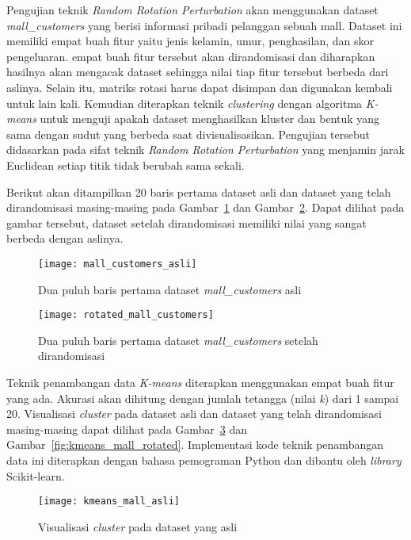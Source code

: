 Pengujian teknik \textit{Random Rotation Perturbation} akan menggunakan dataset \textit{mall\_customers} yang berisi informasi pribadi pelanggan sebuah mall. Dataset ini memiliki empat buah fitur yaitu jenis kelamin, umur, penghasilan, dan skor pengeluaran. empat buah fitur tersebut akan dirandomisasi dan diharapkan hasilnya akan mengacak dataset sehingga nilai tiap fitur tersebut berbeda dari aslinya. Selain itu, matriks rotasi harus dapat disimpan dan digunakan kembali untuk lain kali. Kemudian diterapkan teknik \textit{clustering} dengan algoritma \textit{K-means} untuk menguji apakah dataset menghasilkan kluster dan bentuk yang sama dengan sudut yang berbeda saat divisualisasikan. Pengujian tersebut didasarkan pada sifat teknik \textit{Random Rotation Perturbation} yang menjamin jarak Euclidean setiap titik tidak berubah sama sekali.

Berikut akan ditampilkan 20 baris pertama dataset asli dan dataset yang telah dirandomisasi masing-masing pada Gambar~\ref{fig:mall_customers_asli} dan Gambar~\ref{fig:rotated_mall_customers}. Dapat dilihat pada gambar tersebut, dataset setelah dirandomisasi memiliki nilai yang sangat berbeda dengan aslinya.

\begin{figure}
	\centering
	\texttt{[image: mall\_customers\_asli]}
	\caption{Dua puluh baris pertama dataset \textit{mall\_customers} asli}
	\label{fig:mall_customers_asli}
\end{figure}

\begin{figure}
	\centering
	\texttt{[image: rotated\_mall\_customers]}
	\caption{Dua puluh baris pertama dataset \textit{mall\_customers} setelah dirandomisasi}
	\label{fig:rotated_mall_customers}
\end{figure}

Teknik penambangan data \textit{K-means} diterapkan menggunakan empat buah fitur yang ada. Akurasi akan dihitung dengan jumlah tetangga (nilai \textit{k}) dari 1 sampai 20. Visualisasi \textit{cluster} pada dataset asli dan dataset yang telah dirandomisasi masing-masing dapat dilihat pada Gambar~\ref{fig:kmeans_mall_asli} dan Gambar~\ref{fig:kmeans_mall_rotated}. Implementasi kode teknik penambangan data ini diterapkan dengan bahasa pemograman Python dan dibantu oleh \textit{library} Scikit-learn. 

\begin{figure}
	\centering
	\texttt{[image: kmeans\_mall\_asli]}
	\caption{Visualisasi \textit{cluster} pada dataset yang asli}
	\label{fig:kmeans_mall_asli}
\end{figure}

